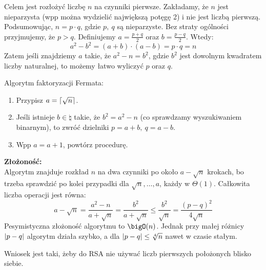 Celem jest rozłożyć liczbę \( n \) na czynniki pierwsze. Zakładamy, że \( n \) jest nieparzysta (wpp można wydzielić największą potęgę 2) i nie jest liczbą pierwszą.
Podsumowując, \( n = p \cdot q \), gdzie \( p, \ q \) są nieparzyste. Bez straty ogólności przyjmujemy, że \( p > q \). Definiujemy \( a = \frac{p+q}{2} \) oraz \( b = \frac{p-q}{2} \). Wtedy:
\[
    a^2 - b^2 = (a+b) \cdot (a-b) = p \cdot q = n
\]
Zatem jeśli znajdziemy \( a \) takie, że \( a^2 - n = b^2 \), gdzie \( b^2 \) jest dowolnym kwadratem liczby naturalnej, to możemy łatwo wyliczyć \( p \) oraz \( q \).

\begin{greyframe}
    Algorytm faktoryzacji Fermata:
    \begin{enumerate}
        \item Przypisz \( a = \left\lceil\sqrt{n}\right\rceil \).
        \item Jeśli istnieje \( b \in \natural \) takie, że \( b^2 = a^2 - n \) (co sprawdzamy wyszukiwaniem binarnym), to zwróć dzielniki \( p = a+b, \ q = a-b \).
        \item Wpp \( a = a + 1\), powtórz procedurę.
    \end{enumerate}
\end{greyframe}

\textbf{Złożoność:} \\
Algorytm znajduje rozkład \( n \) na dwa czynniki po około \( a - \sqrt{n} \) krokach, bo trzeba sprawdzić po kolei przypadki dla \( \sqrt{n}, \dots, a \), każdy w \( \Theta(1) \).
Całkowita liczba operacji jest równa:
\[
    a - \sqrt{n} = \frac{a^2 - n}{a + \sqrt{n}} = \frac{b^2}{a + \sqrt{n}} \leq \frac{b^2}{\sqrt{n}} = \frac{(p-q)^2}{4\sqrt{n}}
\]
Pesymistyczna złożoność algorytmu to \( \bigO(n) \). Jednak przy małej różnicy \( \left\lvert p - q\right\rvert \) algorytm działa szybko, a dla  \( \left\lvert p-q\right\rvert \leq \sqrt[4]{n} \) nawet w czasie stałym.

Wniosek jest taki, żeby do RSA nie używać liczb pierwszych położonych blisko siebie.